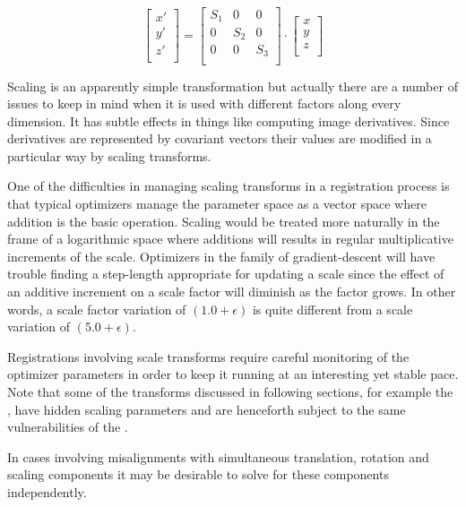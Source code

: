 \begin{equation}
\left[ 
\begin{array}{c}
x' \\
y' \\
z' \\
\end{array}
\right]
=
\left[ 
\begin{array}{ccc}
S_1 &  0  &  0  \\
 0  & S_2 &  0  \\
 0  &  0  & S_3 \\
\end{array}
\right]
\cdot
\left[ 
\begin{array}{c}
x  \\
y  \\
z  \\
\end{array}
\right]
\end{equation}


Scaling is an apparently simple transformation but actually there are a number of
issues to keep in mind when it is used with different factors
along every dimension. It has subtle effects in things like computing image
derivatives. Since derivatives are represented by covariant vectors their
values are modified in a particular way by scaling transforms.

One of the difficulties in managing scaling transforms in a registration
process is that typical optimizers manage the parameter space as a vector space
where addition is the basic operation. Scaling would be treated more
naturally in the frame of a logarithmic space where additions will results in
regular multiplicative increments of the scale. Optimizers in the family of
gradient-descent will have trouble finding a step-length appropriate for
updating a scale since the effect of an additive increment on a scale factor
will diminish as the factor grows. In other words, a scale factor variation of
$(1.0+ \epsilon)$ is quite different from a scale variation of $(5.0+\epsilon)$.

Registrations involving scale transforms require careful monitoring of the
optimizer parameters in order to keep it running at an interesting yet stable
pace. Note that some of the transforms discussed in following sections, for
example the , have hidden scaling parameters and are henceforth
subject to the same vulnerabilities of the .

In cases involving misalignments with simultaneous translation, rotation
and scaling components it may be desirable to solve for these components
independently.



